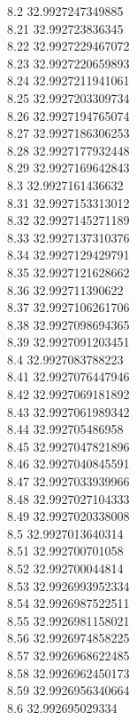 {8.2	32.9927247349885\\
8.21	32.992723836345\\
8.22	32.9927229467072\\
8.23	32.9927220659893\\
8.24	32.9927211941061\\
8.25	32.9927203309734\\
8.26	32.9927194765074\\
8.27	32.9927186306253\\
8.28	32.9927177932448\\
8.29	32.9927169642843\\
8.3	32.9927161436632\\
8.31	32.9927153313012\\
8.32	32.9927145271189\\
8.33	32.9927137310376\\
8.34	32.9927129429791\\
8.35	32.9927121628662\\
8.36	32.992711390622\\
8.37	32.9927106261706\\
8.38	32.9927098694365\\
8.39	32.9927091203451\\
8.4	32.9927083788223\\
8.41	32.9927076447946\\
8.42	32.9927069181892\\
8.43	32.9927061989342\\
8.44	32.992705486958\\
8.45	32.9927047821896\\
8.46	32.9927040845591\\
8.47	32.9927033939966\\
8.48	32.9927027104333\\
8.49	32.9927020338008\\
8.5	32.9927013640314\\
8.51	32.992700701058\\
8.52	32.992700044814\\
8.53	32.9926993952334\\
8.54	32.9926987522511\\
8.55	32.9926981158021\\
8.56	32.9926974858225\\
8.57	32.9926968622485\\
8.58	32.9926962450173\\
8.59	32.9926956340664\\
8.6	32.992695029334\\
}
